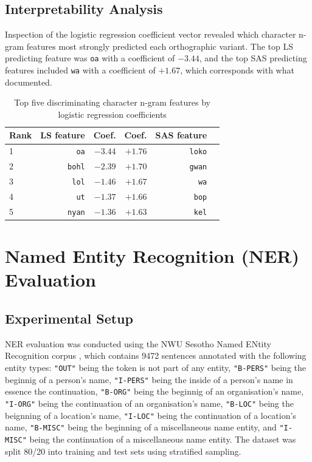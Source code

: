 \documentclass[12pt]{ThesisRU}
\begin{document}
\subsection{Interpretability Analysis}

Inspection of the logistic regression coefficient vector revealed which character n-gram features most strongly predicted each orthographic variant. The top LS predicting feature was \texttt{oa} with a coefficient of $-3.44$, and the top SAS predicting features included \texttt{wa} with a coefficient of $+1.67$, which corresponds with what \citet{makutoane2022people} documented.

\begin{table}[ht]
    \centering
    \begin{tabular}{lrrrrr}
     \toprule
        \textbf{Rank} & \textbf{LS feature} & \textbf{Coef.}
                      & \textbf{Coef.} & \textbf{SAS feature} \\
        \midrule
        1 & \texttt{oa}   & $-3.44$ & $+1.76$ & \texttt{loko} \\
        2 & \texttt{bohl} & $-2.39$ & $+1.70$ & \texttt{gwan} \\
        3 & \texttt{lol}  & $-1.46$ & $+1.67$ & \texttt{wa}   \\
        4 & \texttt{ut}   & $-1.37$ & $+1.66$ & \texttt{bop}  \\
        5 & \texttt{nyan} & $-1.36$ & $+1.63$ & \texttt{kel}  \\
    \bottomrule
    \end{tabular}
    \caption{Top five discriminating character n-gram features by logistic regression coefficients}
    \label{tab:clf_compare}
\end{table}


\section{Named Entity Recognition (NER) Evaluation}
\subsection{Experimental Setup}
NER evaluation was conducted using the NWU Sesotho Named ENtity Recognition corpus \citep{eiselen2014developing}, which contains 9472 sentences annotated with the following entity types: \texttt{"OUT"} being the token is not part of any entity, \texttt{"B-PERS"} being the beginnig of a person's name, \texttt{"I-PERS"} being the inside of a person's name in essence the continuation, \texttt{"B-ORG"} being the beginnig of an organisation's name, \texttt{"I-ORG"} being the continuation of an organisation's name, \texttt{"B-LOC"} being the beignning of a location's name, \texttt{"I-LOC"} being the continuation of a location's name, \texttt{"B-MISC"} being the beginning of a miscellaneous name entity, and \texttt{"I-MISC"} being the continuation of a miscellaneous name entity. The dataset was split 80/20 into training and test sets using stratified sampling. 
\end{document}
